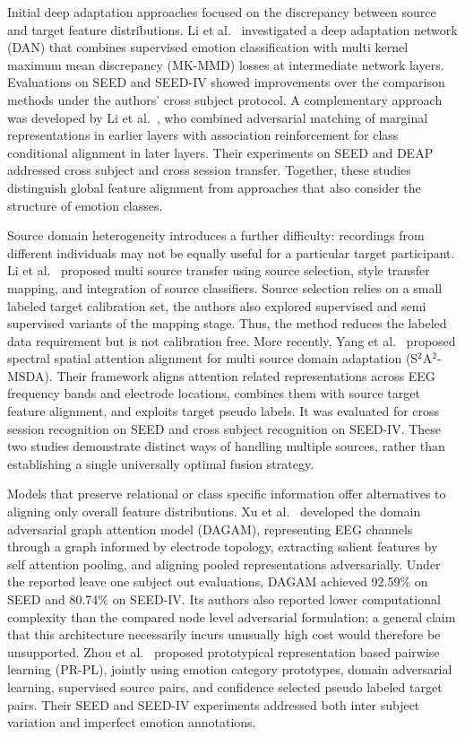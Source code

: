 \documentclass[ASNA,twocolumn]{USG}
\begin{document}
Initial deep adaptation approaches focused on the discrepancy between source and target feature distributions. Li et al.~\cite{li2018cross} investigated a deep adaptation network (DAN) that combines supervised emotion classification with multi kernel maximum mean discrepancy (MK-MMD) losses at intermediate network layers. Evaluations on SEED and SEED-IV showed improvements over the comparison methods under the authors' cross subject protocol. A complementary approach was developed by Li et al.~\cite{li2019domain}, who combined adversarial matching of marginal representations in earlier layers with association reinforcement for class conditional alignment in later layers. Their experiments on SEED and DEAP addressed cross subject and cross session transfer. Together, these studies distinguish global feature alignment from approaches that also consider the structure of emotion classes.

Source domain heterogeneity introduces a further difficulty: recordings from different individuals may not be equally useful for a particular target participant. Li et al.~\cite{li2019multisource} proposed multi source transfer using source selection, style transfer mapping, and integration of source classifiers. Source selection relies on a small labeled target calibration set, the authors also explored supervised and semi supervised variants of the mapping stage. Thus, the method reduces the labeled data requirement but is not calibration free. More recently, Yang et al.~\cite{yang2024spectral} proposed spectral spatial attention alignment for multi source domain adaptation (S$^{2}$A$^{2}$-MSDA). Their framework aligns attention related representations across EEG frequency bands and electrode locations, combines them with source target feature alignment, and exploits target pseudo labels. It was evaluated for cross session recognition on SEED and cross subject recognition on SEED-IV. These two studies demonstrate distinct ways of handling multiple sources, rather than establishing a single universally optimal fusion strategy.

Models that preserve relational or class specific information offer alternatives to aligning only overall feature distributions. Xu et al.~\cite{xu2023dagam} developed the domain adversarial graph attention model (DAGAM), representing EEG channels through a graph informed by electrode topology, extracting salient features by self attention pooling, and aligning pooled representations adversarially. Under the reported leave one subject out evaluations, DAGAM achieved 92.59\% on SEED and 80.74\% on SEED-IV. Its authors also reported lower computational complexity than the compared node level adversarial formulation; a general claim that this architecture necessarily incurs unusually high cost would therefore be unsupported. Zhou et al.~\cite{zhou2023pr} proposed prototypical representation based pairwise learning (PR-PL), jointly using emotion category prototypes, domain adversarial learning, supervised source pairs, and confidence selected pseudo labeled target pairs. Their SEED and SEED-IV experiments addressed both inter subject variation and imperfect emotion annotations.
\end{document}
